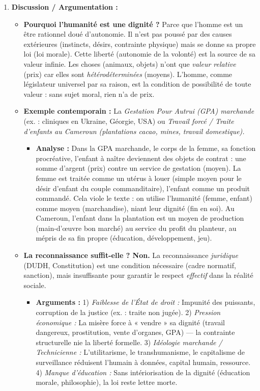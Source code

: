 \documentclass[11pt]{article}
\newcommand{\cle}[1]{{\popxbold\color{popdark}#1}}
\begin{document}
\begin{corrige}
\begin{enumerate}
    \item \textbf{Discussion / Argumentation :}
    \begin{itemize}
        \item[a)] \textbf{Pourquoi l'humanité est une dignité ?} Parce que l'homme est un \cle{être rationnel} doué d'\cle{autonomie}. Il n'est pas poussé par des causes extérieures (instincts, désirs, contrainte physique) mais se \cle{donne sa propre loi} (loi morale). Cette \cle{liberté} (autonomie de la volonté) est la source de sa valeur infinie. Les choses (animaux, objets) n'ont que \emph{valeur relative} (prix) car elles sont \emph{hétérodéterminées} (moyens). L'homme, comme \cle{législateur universel} par sa raison, est la \cle{condition de possibilité} de toute valeur : sans sujet moral, rien n'a de prix.
        \item[b)] \textbf{Exemple contemporain :} La \emph{Gestation Pour Autrui (GPA) marchande} (ex. : cliniques en Ukraine, Géorgie, USA) ou \emph{Travail forcé / Traite d'enfants au Cameroun (plantations cacao, mines, travail domestique).}
        \begin{itemize}
            \item \textbf{Analyse :} Dans la GPA marchande, le corps de la femme, sa fonction procréative, l'enfant à naître deviennent des \cle{objets de contrat} : une somme d'argent (prix) contre un service de gestation (moyen). La femme est traitée comme un \cle{utérus à louer} (simple moyen pour le désir d'enfant du couple commanditaire), l'enfant comme un \cle{produit commandé}. Cela viole le texte : on utilise l'humanité (femme, enfant) comme \cle{moyen} (marchandise), niant leur \cle{dignité} (fin en soi). Au Cameroun, l'enfant dans la plantation est un \cle{moyen de production} (main-d'œuvre bon marché) au service du profit du planteur, au mépris de sa \cle{fin propre} (éducation, développement, jeu).
        \end{itemize}
        \item[c)] \textbf{La reconnaissance suffit-elle ? \textbf{Non.}} La reconnaissance \emph{juridique} (DUDH, Constitution) est une condition \cle{nécessaire} (cadre normatif, sanction), mais \cle{insuffisante} pour garantir le respect \emph{effectif} dans la réalité sociale.
        \begin{itemize}
            \item \textbf{Arguments :} 1) \emph{Faiblesse de l'État de droit :} Impunité des puissants, corruption de la justice (ex. : traite non jugée). 2) \emph{Pression économique :} La misère force à « vendre » sa dignité (travail dangereux, prostitution, vente d'organes, GPA) — la contrainte structurelle nie la liberté formelle. 3) \emph{Idéologie marchande / Technicienne :} L'utilitarisme, le transhumanisme, le capitalisme de surveillance réduisent l'humain à \cle{données}, \cle{capital humain}, \cle{ressource}. 4) \emph{Manque d'éducation :} Sans intériorisation de la dignité (éducation morale, philosophie), la loi reste lettre morte.

\end{itemize}
\end{itemize}
\end{enumerate}
\end{corrige}
\end{document}
